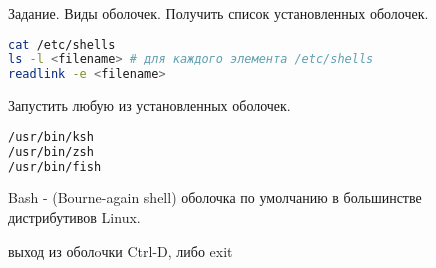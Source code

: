 \begin{frame}[fragile]{Задание. Виды оболочек.}
Получить список установленных оболочек.
\begin{lstlisting}[language=bash]
cat /etc/shells
ls -l <filename> # для каждого элемента /etc/shells
readlink -e <filename> 
\end{lstlisting}
Запустить любую из установленных оболочек. 

\begin{lstlisting}[language=bash]
/usr/bin/ksh 
/usr/bin/zsh 
/usr/bin/fish
\end{lstlisting}

\alert{Bash} - (Bourne-again shell) оболочка по умолчанию в большинстве дистрибутивов Linux.

выход из оболoчки  Ctrl-D, либо exit
\end{frame}
